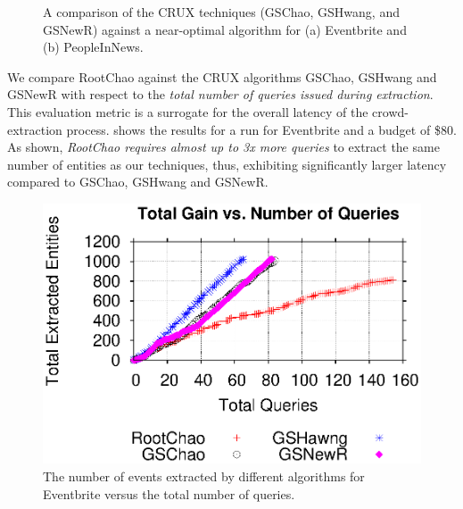 \begin{figure}[h]
\begin{center}
\end{center}
\vspace{-5pt}
\caption{A comparison of the CRUX techniques (GSChao, GSHwang, and GSNewR) against a near-optimal algorithm for (a) Eventbrite and (b) PeopleInNews.}
\label{fig:resultsextr}
\vspace{-10pt}
\end{figure}

We compare RootChao against the CRUX algorithms GSChao, GSHwang and GSNewR with respect to the {\em total number of queries issued during extraction}. This evaluation metric is a surrogate for the overall latency of the crowd-extraction process.  shows the results for a run for Eventbrite and a budget of \$80. As shown, {\em RootChao requires almost up to 3x more queries} to extract the same number of entities as our techniques, thus, exhibiting significantly larger latency compared to GSChao, GSHwang and GSNewR.

\begin{figure}[h]
	\begin{center}
	\vspace{-10pt}
	\includegraphics[clip,scale=0.4]{figs/gain_rounds.eps}
	\caption{The number of events extracted by different algorithms for Eventbrite versus the total number of queries.}
	\label{fig:rounds}
	\end{center}
	\vspace{-5pt}
\end{figure}

